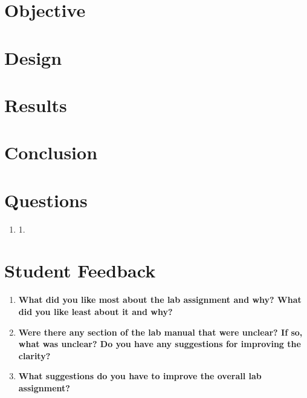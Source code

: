 \documentclass[a4paper,12pt]{article}
\begin{document}
\section*{Objective}

\section*{Design}

% 

\section*{Results}



\section*{Conclusion}


\section*{Questions}

\begin{enumerate}
  \item 1.
\end{enumerate}

\section*{Student Feedback}

\begin{enumerate}
  \item \textbf{What did you like most about the lab assignment and why? What did you like least about it and why?}
  \vspace{10pt}

  \item \textbf{Were there any section of the lab manual that were unclear? If so, what was unclear? Do you have any suggestions for improving the clarity?}
  \vspace{10pt}

  \item \textbf{What suggestions do you have to improve the overall lab assignment?}
  \vspace{10pt}

\end{enumerate}
\end{document}
